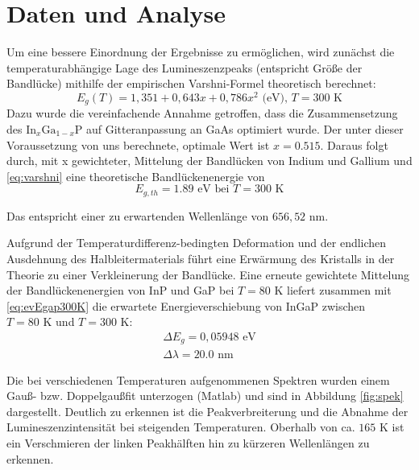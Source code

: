 \documentclass[aps,twocolumn,secnumarabic,nobalancelastpage,amsmath,amssymb,
nofootinbib,superscriptaddress]{revtex4-1}
\begin{document}

\section{Daten und Analyse}

\noindent Um eine bessere Einordnung der Ergebnisse zu ermöglichen, wird zunächst die temperaturabhängige Lage des Lumineszenzpeaks
(entspricht Größe der Bandlücke) mithilfe der empirischen Varshni-Formel theoretisch berechnet:
\begin{equation}
  E_{g}(T) = 1,351+0,643x+0,786x^2\text{ (eV), }T=300\text{ K}
   \label{eq:varshni}
\end{equation}
Dazu wurde die vereinfachende Annahme getroffen, dass die Zusammensetzung des $\text{In}_x\text{Ga}_{1-x}\text{P}$
auf Gitteranpassung an GaAs optimiert wurde. Der unter dieser Voraussetzung von uns berechnete,
optimale Wert ist $x=0.515$. Daraus folgt durch, mit x gewichteter, Mittelung der Bandlücken von
Indium und Gallium und \ref{eq:varshni} eine theoretische Bandlückenenergie von
\begin{equation}
  E_{g,th} = 1.89\text{ eV}\text{ bei }T=300\text{ K}
   \label{eq:evEgap300K}
\end{equation}

\noindent Das entspricht einer zu erwartenden Wellenlänge von $656,52$ nm.

Aufgrund der Temperaturdifferenz-bedingten Deformation und der endlichen Ausdehnung des Halbleitermaterials
führt eine Erwärmung des Kristalls in der Theorie zu einer Verkleinerung der Bandlücke. Eine erneute gewichtete
Mittelung der Bandlückenenergien von InP und GaP bei $T=80\text{ K}$ liefert zusammen mit \ref{eq:evEgap300K}
die erwartete Energieverschiebung von InGaP zwischen $T=80\text{ K}$ und $T=300\text{ K}$:
\begin{eqnarray}
  \Delta E_g = 0,05948\text{ eV}
  \\
  \nonumber
  \Delta\lambda = 20.0\text{ nm}\;\;\;\;\,\,
\label{eq:evVersch}
\end{eqnarray}


\noindent Die bei verschiedenen Temperaturen aufgenommenen Spektren wurden einem Gauß- bzw. Doppelgaußfit
unterzogen (Matlab) und sind in Abbildung \ref{fig:spek} dargestellt. Deutlich zu erkennen ist die Peakverbreiterung
und die Abnahme der Lumineszenzintensität bei steigenden Temperaturen. Oberhalb von ca. $165\text{ K}$
ist ein Verschmieren der linken Peakhälften hin zu kürzeren Wellenlängen zu erkennen.
\end{document}
